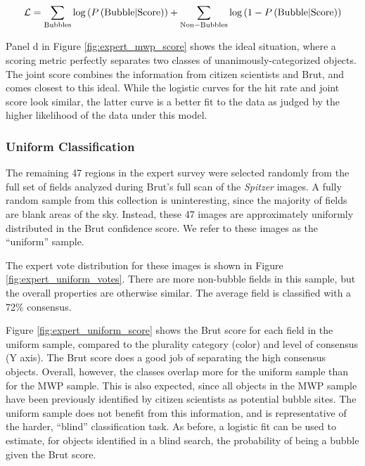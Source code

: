 \begin{equation}
\mathcal{L} = \sum_{\rm Bubbles} \log\left(P\left({\rm Bubble | Score}\right)\right) + \sum_{\rm Non-Bubbles} \log\left(1 - P\left({\rm Bubble | Score}\right)\right)
\label{eq:likelihood}
\end{equation}

Panel d in Figure \ref{fig:expert_mwp_score} shows the ideal situation, where a scoring metric perfectly separates two classes of unanimously-categorized objects. The joint score combines the information from citizen scientists and Brut, and comes closest to this ideal. While the logistic curves for the hit rate and joint score look similar, the latter curve is a better fit to the data as judged by the higher likelihood of the data under this model.

\subsubsection{Uniform Classification}
The remaining 47 regions in the expert survey were selected randomly from the full set of fields analyzed during Brut's full scan of the \emph{Spitzer} images. A fully random sample from this collection is uninteresting, since the majority of fields are blank areas of the sky. Instead, these 47 images are approximately uniformly distributed in the Brut confidence score. We refer to these images as the ``uniform'' sample.

The expert vote distribution for these images is shown in Figure \ref{fig:expert_uniform_votes}. There are more non-bubble fields in this sample, but the overall properties are otherwise similar. The average field is classified with a 72\% consensus.

Figure \ref{fig:expert_uniform_score} shows the Brut score for each field in the uniform sample, compared to the plurality category (color) and level of consensus (Y axis). The Brut score does a good job of separating the high consensus objects. Overall, however, the classes overlap more for the uniform sample than for the MWP sample. This is also expected, since all objects in the MWP sample have been previously identified by citizen scientists as potential bubble sites. The uniform sample does not benefit from this information, and is representative of the harder, ``blind'' classification task. As before, a logistic fit can be used to estimate, for objects identified in a blind search, the probability of being a bubble given the Brut score.

